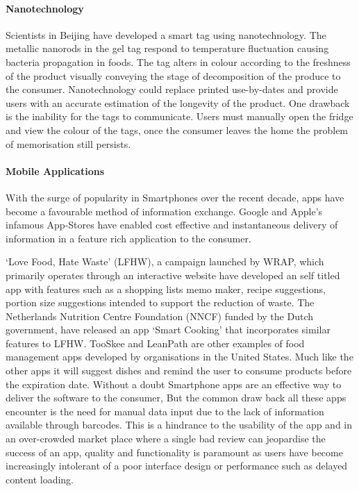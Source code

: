 \documentclass[a4paper, 11pt]{article}
\begin{document}
\paragraph{Nanotechnology}
Scientists in Beijing have developed a smart tag using nanotechnology. The metallic nanorods in the gel tag respond to temperature fluctuation causing bacteria propagation in foods. The tag alters in colour according to the freshness of the product visually conveying the stage of decomposition of the produce to the consumer. Nanotechnology could replace printed use-by-dates and provide users with an accurate estimation of the longevity of the product. One drawback is the inability for the tags to communicate. Users must manually open the fridge and view the colour of the tags, once the consumer leaves the home the problem of memorisation still persists.\cite{FoodWaste}

\paragraph{Mobile Applications}
With the surge of popularity in Smartphones over the recent decade, apps have become a favourable method of information exchange. Google and Apple's infamous App-Stores have enabled cost effective and instantaneous delivery of information in a feature rich application to the consumer.

`Love Food, Hate Waste' (LFHW), a campaign launched by WRAP, which primarily operates through an interactive website have developed an self titled app with features such as a shopping lists memo maker, recipe suggestions, portion size suggestions intended to support the reduction of waste. The Netherlands Nutrition Centre Foundation (NNCF) funded by the Dutch government, have released an app `Smart Cooking' that incorporates similar features to LFHW. TooSkee and LeanPath\cite{FoodWaste} are other examples of food management apps developed by organisations in the United States. Much like the other apps it will suggest dishes and remind the user to consume products before the expiration date. Without a doubt Smartphone apps are an effective way to deliver the software to the consumer, But the common draw back all these apps encounter is the need for manual data input due to the lack of information available through barcodes. This is a hindrance to the usability of the app and in an over-crowded market place where a single bad review can jeopardise the success of an app, quality and functionality is paramount as users have become increasingly intolerant of a poor interface design or performance such as delayed content loading.
\end{document}
